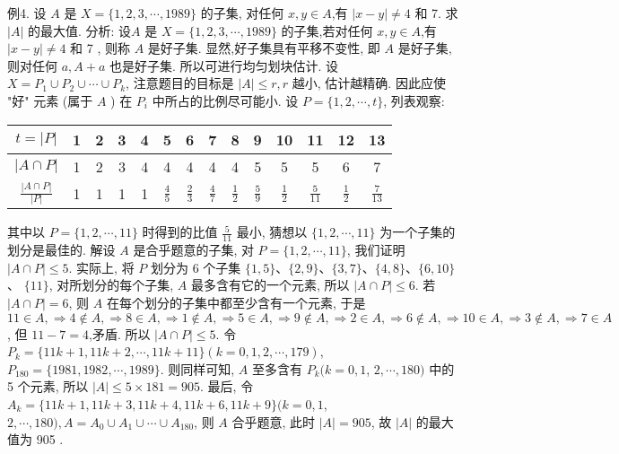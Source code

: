 例4. 设 $A$ 是 $X=\{1,2,3, \cdots, 1989\}$ 的子集, 对任何 $x, y \in A$,有 $|x-y| \neq 4$ 和 7. 求 $|A|$ 的最大值.
分析: 设$A$ 是 $X=\{1,2,3, \cdots, 1989\}$ 的子集,若对任何 $x, y \in A$,有 $|x-y| \neq 4$ 和 7 , 则称 $A$ 是好子集.
显然,好子集具有平移不变性, 即 $A$ 是好子集,则对任何 $a, A+a$ 也是好子集.
所以可进行均匀划块估计.
设 $X=P_1 \cup P_2 \cup \cdots \cup P_k$, 注意题目的目标是 $|A| \leqslant r, r$ 越小, 估计越精确.
因此应使 "好" 元素 (属于 $A$ ) 在 $P_i$ 中所占的比例尽可能小.
设 $P= \{1,2, \cdots, t\}$, 列表观察:
\begin{tabular}{c|ccccccccccccc}
$t=|P|$ & 1 & 2 & 3 & 4 & 5 & 6 & 7 & 8 & 9 & 10 & 11 & 12 & 13 \\
\hline
$|A \cap P|$ & 1 & 2 & 3 & 4 & 4 & 4 & 4 & 4 & 5 & 5 & 5 & 6 & 7 \\
\hline
$\frac{|A \cap P|}{|P|}$ & 1 & 1 & 1 & 1 & $\frac{4}{5}$ & $\frac{2}{3}$ & $\frac{4}{7}$ & $\frac{1}{2}$ & $\frac{5}{9}$ & $\frac{1}{2}$ & $\frac{5}{11}$ & $\frac{1}{2}$ & $\frac{7}{13}$
\end{tabular}
其中以 $P=\{1,2, \cdots, 11\}$ 时得到的比值 $\frac{5}{11}$ 最小, 猜想以 $\{1,2, \cdots, 11\}$ 为一个子集的划分是最佳的.
解设 $A$ 是合乎题意的子集, 对 $P=\{1,2, \cdots, 11\}$, 我们证明 $\mid A \cap P \mid \leqslant 5$.
实际上, 将 $P$ 划分为 6 个子集 $\{1,5\} 、\{2,9\} 、\{3,7\} 、\{4,8\} 、\{6,10\}$ 、 $\{11\}$, 对所划分的每个子集, $A$ 最多含有它的一个元素, 所以 $|A \cap P| \leqslant 6$. 若 $|A \cap P|=6$, 则 $A$ 在每个划分的子集中都至少含有一个元素, 于是 $11 \in A, \Rightarrow 4 \notin A, \Rightarrow 8 \in A, \Rightarrow 1 \notin A, \Rightarrow 5 \in A, \Rightarrow 9 \notin A, \Rightarrow 2 \in A, \Rightarrow 6 \notin A, \Rightarrow 10 \in A, \Rightarrow 3 \notin A, \Rightarrow 7 \in A$, 但 $11-7=4$,矛盾.
所以 $|A \cap P| \leqslant 5$.
令 $P_k=\{11 k+1,11 k+2, \cdots, 11 k+11\}(k=0,1,2, \cdots, 179)$, $P_{180}=\{1981,1982, \cdots, 1989\}$. 则同样可知, $A$ 至多含有 $P_k(k=0,1$, $2, \cdots, 180)$ 中的 5 个元素, 所以 $|A| \leqslant 5 \times 181=905$.
最后, 令 $A_k=\{11 k+1,11 k+3,11 k+4,11 k+6,11 k+9\}(k=0,1$, $2, \cdots, 180), A=A_0 \cup A_1 \cup \cdots \cup A_{180}$, 则 $A$ 合乎题意, 此时 $|A|=905$, 故 $|A|$ 的最大值为 905 .



